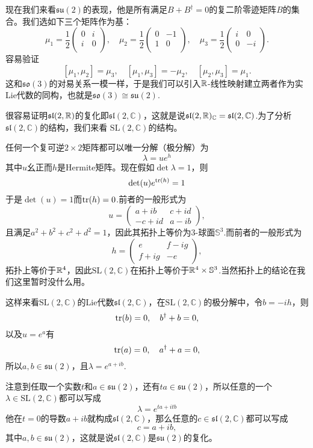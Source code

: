 \documentclass[9pt]{extbook}
\theoremstyle{plain}
\newcommand{\cc}{\mathbb{C}}
\begin{document}
现在我们来看$\mathfrak{su}(2)$的表现，他是所有满足$B+B^\dag=0$的复二阶零迹矩阵$B$的集合。我们选如下三个矩阵作为基：
\[
\mu_1=\frac{1}{2}\begin{pmatrix}
	0&i\\
	i&0\\
\end{pmatrix},\quad
\mu_2=\frac{1}{2}\begin{pmatrix}
	0&-1\\
	1&0\\
\end{pmatrix},\quad
\mu_3=\frac{1}{2}\begin{pmatrix}
	i&0\\
	0&-i\\
\end{pmatrix}.
\]
容易验证
\[
[\mu_1,\mu_2]=\mu_3,\quad [\mu_1,\mu_3]=-\mu_2,\quad [\mu_2,\mu_3]=\mu_1.
\]
这和$\mathfrak{so}(3)$的对易关系一模一样，于是我们可以引入$\mathbb{R}$-线性映射建立两者作为实Lie代数的同构，也就是$\mathfrak{so}(3)\cong \mathfrak{su}(2)$.

很容易证明$\mathfrak{sl}(2,\mathbb{R})$的复化即$\mathfrak{sl}(2,\cc)$，这就是说$\mathfrak{sl}(2,\rr)_\cc=\mathfrak{sl}(2,\cc)$.为了分析$\mathfrak{sl}(2,\cc)$的结构，我们来看
$\mathrm{SL}(2,\mathbb{C})$的结构。

任何一个复可逆$2\times 2$矩阵都可以唯一分解（极分解）为
\[
\lambda=ue^{h}
\]
其中$u$幺正而$h$是Hermite矩阵。现在假如$\det \lambda=1$，则
\[
\det(u)e^{\operatorname{tr}(h)}=1
\]
于是$\det(u)=1$而$\operatorname{tr}(h)=0$.前者的一般形式为
\[
u=
\begin{pmatrix}
a+ib&c+id\\
-c+id&a-ib
\end{pmatrix},
\]
且满足$a^2+b^2+c^2+d^2=1$，因此其拓扑上等价为3-球面$\mathbb{S}^3$.而前者的一般形式为
\[
h=\begin{pmatrix}
e&f-ig\\
f+ig&-e
\end{pmatrix},
\]
拓扑上等价于$\mathbb{R}^4$，因此$\mathrm{SL}(2,\cc)$在拓扑上等价于$\mathbb{R}^4\times \mathbb{S}^3$.当然拓扑上的结论在我们这里暂时没什么用。

这样来看$\mathrm{SL}(2,\cc)$的Lie代数$\mathfrak{sl}(2,\mathbb{C})$，在$\mathrm{SL}(2,\cc)$的极分解中，令$b=-ih$，则
\[
\operatorname{tr}(b)=0,\quad b^\dag+b=0,
\]
以及$u=e^a$有
\[
\operatorname{tr}(a)=0,\quad a^\dag+a=0,
\]
所以$a,b\in\mathfrak{su}(2)$，且$\lambda=e^{a+ib}$.

注意到任取一个实数$t$和$a\in\mathfrak{su}(2)$，还有$ta \in\mathfrak{su}(2)$，所以任意的一个$\lambda \in \mathrm{SL}(2,\cc)$都可以写成
\[
\lambda=e^{ta+itb}
\]
他在$t=0$的导数$a+ib$就构成$\mathfrak{sl}(2,\cc)$，那么任意的$c\in \mathfrak{sl}(2,\cc)$都可以写成
\[
c=a+ib,
\]
其中$a,b\in\mathfrak{su}(2)$，这就是说$\mathfrak{sl}(2,\cc)$是$\mathfrak{su}(2)$的复化。
\end{document}
